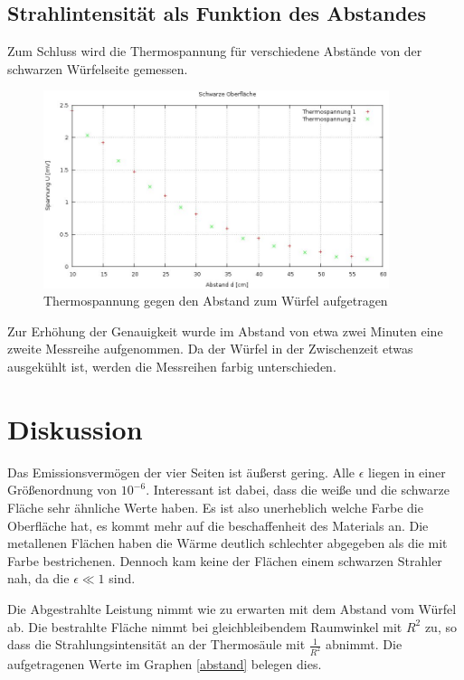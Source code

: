 \subsection{Strahlintensität als Funktion des Abstandes}
Zum Schluss wird die Thermospannung für verschiedene Abstände von der schwarzen Würfelseite gemessen.

\begin{figure}[H]
\includegraphics[width=0.9\textwidth]{pics/temp_abstand.jpg}
\caption{Thermospannung gegen den Abstand zum Würfel aufgetragen}
\label{abstand}
\end{figure}

Zur Erhöhung der Genauigkeit wurde im Abstand von etwa zwei Minuten eine zweite Messreihe aufgenommen. Da der Würfel in der Zwischenzeit etwas ausgekühlt ist, werden die Messreihen farbig unterschieden.

\section{Diskussion}
Das Emissionsvermögen der vier Seiten ist äußerst gering. Alle $\epsilon$ liegen in einer Größenordnung von $10^{-6}$. Interessant ist dabei, dass die weiße und die schwarze Fläche sehr ähnliche Werte haben. Es ist also unerheblich welche Farbe die Oberfläche hat, es kommt mehr auf die beschaffenheit des Materials an. Die metallenen Flächen haben die Wärme deutlich schlechter abgegeben als die mit Farbe bestrichenen. Dennoch kam keine der Flächen einem schwarzen Strahler nah, da die $\epsilon \ll 1$ sind.

Die Abgestrahlte Leistung nimmt wie zu erwarten mit dem Abstand vom Würfel ab. Die bestrahlte Fläche nimmt bei gleichbleibendem Raumwinkel mit $R^2$ zu, so dass die Strahlungsintensität an der Thermosäule mit $\frac{1}{R^2}$ abnimmt. Die aufgetragenen Werte im Graphen \eqref{abstand} belegen dies.







